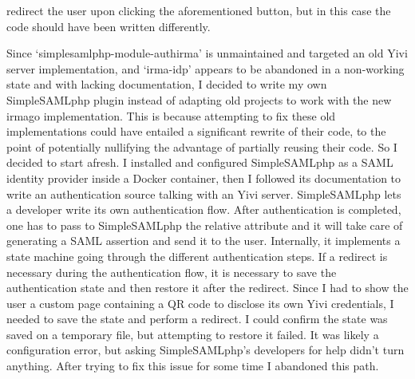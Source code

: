 \documentclass{report}
\begin{document}
redirect the user upon clicking the aforementioned button, but in this case the code should have been written differently. 
\par
Since \enquote*{simplesamlphp-module-authirma} is unmaintained and targeted an old Yivi server implementation, and \enquote*{irma-idp} appears to be abandoned in a non-working
state and with lacking documentation, I decided to write my own SimpleSAMLphp plugin instead of adapting old projects to work with the new irmago implementation. This is because
attempting to fix these old implementations could have entailed a significant rewrite of their code, to the point of potentially nullifying the advantage of partially reusing their
code. So I decided to start afresh. I installed and configured SimpleSAMLphp \cite{simplesamlphp-docs} as a SAML identity provider \cite{sstc-saml-core-errata-2.0-wd-07} inside a
Docker container, then I followed its documentation to write an authentication source talking with an Yivi server. SimpleSAMLphp lets a developer write its own authentication
flow. After authentication is completed, one has to pass to SimpleSAMLphp the relative attribute and it will take care of generating a SAML assertion and send it to the user.
Internally, it implements a state machine going through the different authentication steps. If a redirect is necessary during the authentication flow, it is necessary to save the
authentication state and then restore it after the redirect.  Since I had to show the user a custom page containing a QR code to disclose its own Yivi credentials, I needed to save
the state and perform a redirect. I could confirm the state was saved on a temporary file, but attempting to restore it failed. It was likely a configuration error, but asking
SimpleSAMLphp's developers for help didn't turn anything. After trying to fix this issue for some time I abandoned this path.
\end{document}
